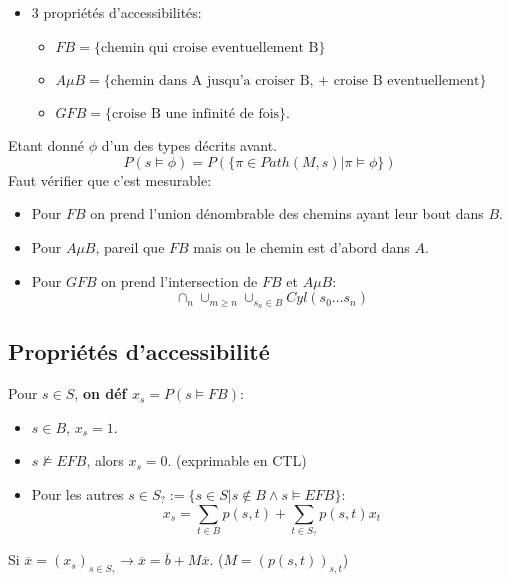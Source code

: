 \documentclass[12pt]{article}
\theoremstyle{plain}
\theoremstyle{definition}
\theoremstyle{remark}
\begin{document}
\begin{itemize}
    \item 3 propriétés d'accessibilités:
    \begin{itemize}
        \item $FB=\{\text{chemin qui croise eventuellement B}\}$
        \item $A\mu B=\{\text{chemin dans A jusqu'a croiser B, + croise B eventuellement}\} $
        \item $GFB=\{\text{croise B une infinité de fois}\}$.
    \end{itemize}
\end{itemize}
Etant donné $\phi$ d'un des types décrits avant. 
\[
    P(s\vDash \phi) = P(\{\pi\in Path(M,s)|\pi\vDash\phi\})
\]
Faut vérifier que c'est mesurable:
\begin{itemize}
    \item Pour $FB$ on prend l'union dénombrable des chemins ayant leur bout dans $B$.
    \item Pour $A\mu B$, pareil que $FB$ mais ou le chemin est d'abord dans $A$.
    \item Pour $GFB$ on prend l'intersection de $FB$ et $A\mu B$: 
    \[
        \cap_n\cup_{m\geq n}\cup_{s_n\in B}Cyl(s_0\ldots s_n)
    \]
\end{itemize}

\subsection{Propriétés d'accessibilité}
Pour $s\in S$, \textbf{on déf $x_s=P(s\vDash FB)$}:
\begin{itemize}
    \item $s\in B$, $x_s=1$.
    \item $s\nvDash EFB$, alors $x_s=0$. (exprimable en CTL)
    \item Pour les autres $s\in S_{?}:= \{s\in S| s\notin B \wedge s\vDash EFB\}$:
    \[
        x_s = \sum_{t\in B}p(s,t)+ \sum_{t\in S_{?}}p(s,t)x_t
    \]
\end{itemize}

\noindent Si $\overline{x} = (x_s)_{s\in S_?}\to \overline{x}=\overline{b}+M\overline{x}$. ($M=(p(s,t))_{s,t}$)\\
\end{document}
